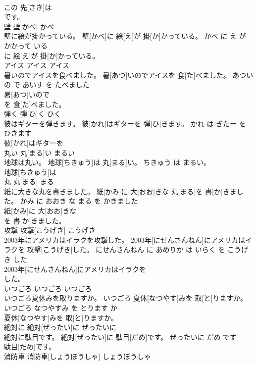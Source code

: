 \documentclass[8pt]{extreport}
\begin{document}
\begin{CJK}{UTF8}{min}
\\	この 先[さき]は
\\	です。		
\\	壁	壁[かべ]	かべ	
\\	壁に絵が掛かっている。	壁[かべ]に 絵[え]が 掛[か]かっている。	かべ に え が かかって いる	
\\	に 絵[え]が 掛[か]かっている。		
\\	アイス	アイス	アイス	
\\	暑いのでアイスを食べました。	暑[あつ]いのでアイスを 食[た]べました。	あつい の で あいす を たべました	
\\	暑[あつ]いので
\\	を 食[た]べました。		
\\	弾く	弾[ひ]く	ひく	
\\	彼はギターを弾きます。	彼[かれ]はギターを 弾[ひ]きます。	かれ は ぎたー を ひきます	
\\	彼[かれ]はギターを
\\	丸い	丸[まる]い	まるい	
\\	地球は丸い。	地球[ちきゅう]は 丸[まる]い。	ちきゅう は まるい。	
\\	地球[ちきゅう]は
\\	丸	丸[まる]	まる	
\\	紙に大きな丸を書きました。	紙[かみ]に 大[おお]きな 丸[まる]を 書[か]きました。	かみ に おおき な まる を かきました	
\\	紙[かみ]に 大[おお]きな
\\	を 書[か]きました。		
\\	攻撃	攻撃[こうげき]	こうげき	
\\	2003年にアメリカはイラクを攻撃した。	2003年[にせんさんねん]にアメリカはイラクを 攻撃[こうげき]した。	にせんさんねん に あめりか は いらく を こうげき した	
\\	2003年[にせんさんねん]にアメリカはイラクを
\\	した。		
\\	いつごろ	いつごろ	いつごろ	
\\	いつごろ夏休みを取りますか。	いつごろ 夏休[なつやす]みを 取[と]りますか。	いつごろ なつやすみ を とります か	
\\	夏休[なつやす]みを 取[と]りますか。		
\\	絶対に	絶対[ぜったい]に	ぜったいに	
\\	絶対に駄目です。	絶対[ぜったい]に 駄目[だめ]です。	ぜったいに だめ です	
\\	駄目[だめ]です。		
\\	消防車	消防車[しょうぼうしゃ]	しょうぼうしゃ	

\end{CJK}
\end{document}
